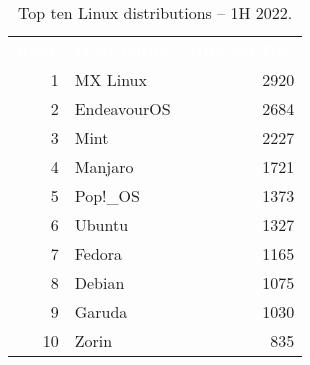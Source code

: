 \begin{table}[htbp!]
    \centering
    \begin{tabular}{rlr}
        \rowcolor{blue}
        \textcolor{white}{\textbf{Rank}} &
        \textcolor{white}{\textbf{Distribution}} &
        \textcolor{white}{\textbf{Hits per Day}} \\
        \rowcolors{2}{gray!15}{white}
        1 & MX Linux & 2920 \\
        2 & EndeavourOS & 2684 \\
        3 & Mint & 2227 \\
        4 & Manjaro & 1721 \\
        5 & Pop!\_OS & 1373 \\
        6 & Ubuntu & 1327 \\
        7 & Fedora & 1165 \\
        8 & Debian & 1075 \\
        9 & Garuda & 1030 \\
        10 & Zorin & 835 \\
    \end{tabular}
    \caption{Top ten Linux distributions -- 1H 2022.}
    \label{tab:distros}
\end{table}
